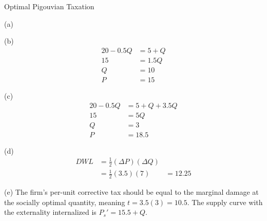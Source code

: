 \documentclass[10pt]{extarticle}
\begin{document}
\begin{problem}{Optimal Pigouvian Taxation}
\begin{problem}{(a)}
\begin{center}
      \end{center}
    \end{problem}
    \begin{problem}{(b)}
      \begin{align*}
        20-0.5Q &= 5 + Q\\
        15 &= 1.5Q\\
        Q &= 10\\
        P &= 15
      \end{align*}
    \end{problem}
    \begin{problem}{(c)}
      \begin{align*}
        20-0.5Q &= 5+Q+3.5Q\\
        15 &= 5Q\\
        Q &= 3\\
        P &= 18.5
      \end{align*}
    \end{problem}
    \begin{problem}{(d)}
      \begin{align*}
        DWL &= \frac{1}{2}(\Delta P)(\Delta Q)\\
            &= \frac{1}{2}(3.5)(7)
            &= 12.25
      \end{align*}
    \end{problem}
    \begin{problem}{(e)}
      The firm's per-unit corrective tax should be equal to the marginal damage at the socially optimal quantity, meaning $t = 3.5(3) = 10.5$. The supply curve with the externality internalized is $P_s' = 15.5 + Q$.
      \begin{center}
      \end{center}
    \end{problem}
  \end{problem}
\end{document}
